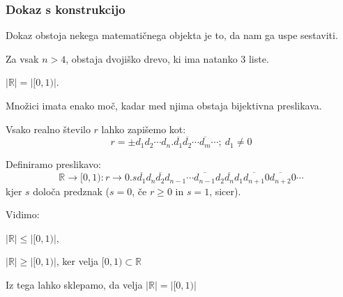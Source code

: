 \documentclass[10pt,a4paper,oneside]{book}
\begin{document}

\pagebreak
{}
\subsubsection{Dokaz s konstrukcijo}
Dokaz obstoja nekega matematičnega objekta je to, da nam ga uspe sestaviti.

\begin{primeri}
\item Za vsak $n>4$, obstaja dvojiško drevo, ki ima natanko $3$ liste.
\item $| \mathbb{R} | = | [0,1) |$.\\
	\begin{items}
	\item Množici imata enako moč, kadar med njima obstaja bijektivna preslikava.
	\item Vsako realno število $r$ lahko zapišemo kot:
	\[ r=\pm d_1 d_2 \cdots d_n . \overline{d_1}\overline{d_2} \cdots \overline{d_m} \cdots;\ d_1 \neq 0 \]
	\item Definiramo preslikavo:
	\[ \mathbb{R}\rightarrow [0,1): r \rightarrow 0.s\overline{d_1} d_{n} \overline{d_2} d_{n-1} \cdots \overline{d_{n-1}} d_2 \overline{d_n} d_1 \overline{d_{n+1}} 0\overline{d_{n+2}} 0 \cdots \]
	kjer $s$ določa predznak ($s=0$, če $r \ge 0$ in $s=1$, sicer).
	\item Vidimo:
		\begin{items}
		\item $|\mathbb{R}|\le |[0,1)|$, %
		\item $|\mathbb{R}|\ge |[0,1)|$, ker velja $[0,1) \subset \mathbb{R}$
		\end{items}
	\item Iz tega lahko sklepamo, da velja $|\mathbb{R}|=|[0,1)|$
	\end{items}
\end{primeri}
	
\end{document}
